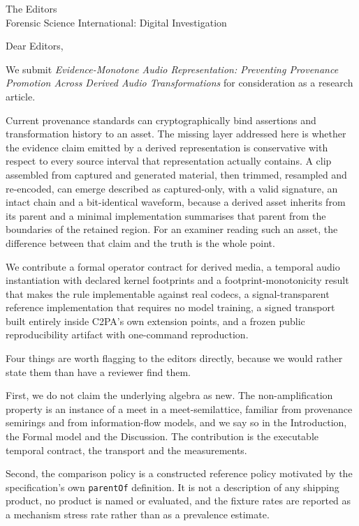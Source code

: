 \documentclass[11pt]{letter}
\begin{document}
\begin{letter}{The Editors\\Forensic Science International: Digital Investigation}
\opening{Dear Editors,}

We submit \emph{Evidence-Monotone Audio Representation: Preventing Provenance
Promotion Across Derived Audio Transformations} for consideration as a research
article.

Current provenance standards can cryptographically bind assertions and
transformation history to an asset. The missing layer addressed here is whether
the evidence claim emitted by a derived representation is conservative with
respect to every source interval that representation actually contains. A clip
assembled from captured and generated material, then trimmed, resampled and
re-encoded, can emerge described as captured-only, with a valid signature, an
intact chain and a bit-identical waveform, because a derived asset inherits
from its parent and a minimal implementation summarises that parent from the
boundaries of the retained region. For an examiner reading such an
asset, the difference between that claim and the truth is the whole point.

We contribute a formal operator contract for derived media, a temporal audio
instantiation with declared kernel footprints and a footprint-monotonicity
result that makes the rule implementable against real codecs, a signal-transparent
reference implementation that requires no model training, a signed transport
built entirely inside C2PA's own extension points, and a frozen public
reproducibility artifact with one-command reproduction.

Four things are worth flagging to the editors directly, because we would rather
state them than have a reviewer find them.

First, we do not claim the underlying algebra as new. The non-amplification
property is an instance of a meet in a meet-semilattice, familiar from
provenance semirings and from information-flow models, and we say so in the
Introduction, the Formal model and the Discussion. The contribution is the
executable temporal contract, the transport and the measurements.

Second, the comparison policy is a constructed reference policy motivated by the
specification's own \texttt{parentOf} definition. It is not a description of any
shipping product, no product is named or evaluated, and the fixture rates are
reported as a mechanism stress rate rather than as a prevalence estimate.


\end{letter}
\end{document}
